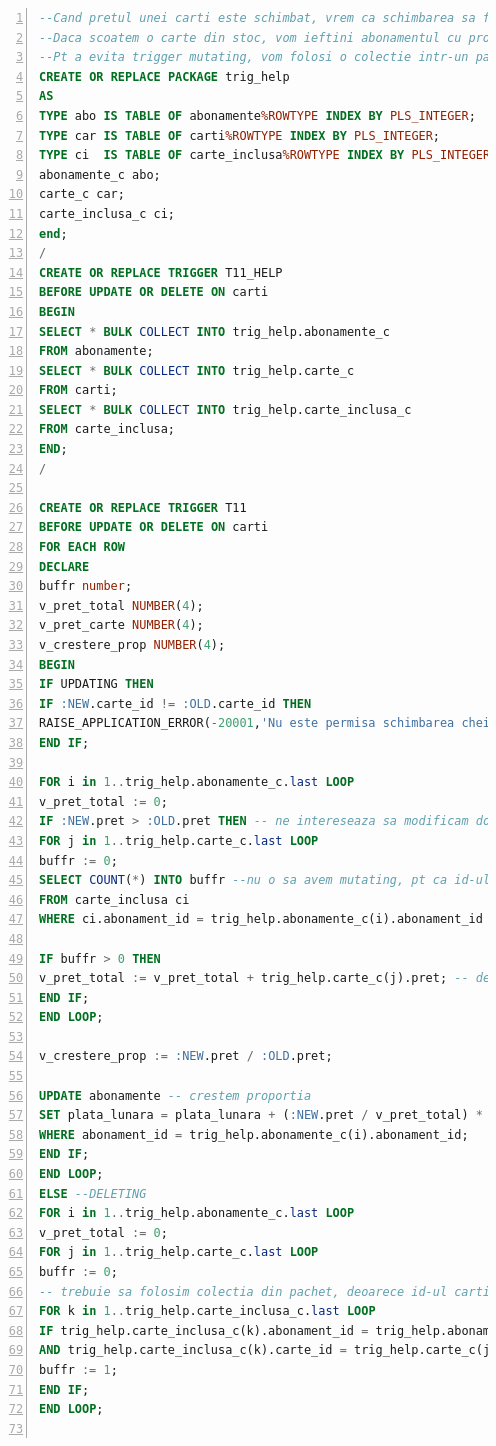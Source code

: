 \documentclass[12pt]{article}
\begin{document}
\begin{lstlisting}[language=SQL,
	showspaces=false,
	basicstyle=\ttfamily,
	numbers=left,
	numberstyle=\tiny,
	breaklines=true,
	commentstyle=\color{gray}]
--Cand pretul unei carti este schimbat, vrem ca schimbarea sa fie reflectata si in abonament, in cazul in care scumpim cartea
--Daca scoatem o carte din stoc, vom ieftini abonamentul cu procentajul pe care pretul cartii il reprezenta din intregul pachet al abonamentului.
--Pt a evita trigger mutating, vom folosi o colectie intr-un pachet, care este intializata cu un trigger la nivel de comanda.
CREATE OR REPLACE PACKAGE trig_help 
AS
TYPE abo IS TABLE OF abonamente%ROWTYPE INDEX BY PLS_INTEGER;
TYPE car IS TABLE OF carti%ROWTYPE INDEX BY PLS_INTEGER;
TYPE ci  IS TABLE OF carte_inclusa%ROWTYPE INDEX BY PLS_INTEGER;
abonamente_c abo;
carte_c car;
carte_inclusa_c ci;
end;
/
CREATE OR REPLACE TRIGGER T11_HELP
BEFORE UPDATE OR DELETE ON carti
BEGIN
SELECT * BULK COLLECT INTO trig_help.abonamente_c
FROM abonamente;
SELECT * BULK COLLECT INTO trig_help.carte_c
FROM carti;
SELECT * BULK COLLECT INTO trig_help.carte_inclusa_c
FROM carte_inclusa;
END;
/

CREATE OR REPLACE TRIGGER T11
BEFORE UPDATE OR DELETE ON carti
FOR EACH ROW
DECLARE 
buffr number;
v_pret_total NUMBER(4);
v_pret_carte NUMBER(4);
v_crestere_prop NUMBER(4);
BEGIN
IF UPDATING THEN
IF :NEW.carte_id != :OLD.carte_id THEN
RAISE_APPLICATION_ERROR(-20001,'Nu este permisa schimbarea cheiilor primare din tabelul Carte');
END IF;

FOR i in 1..trig_help.abonamente_c.last LOOP
v_pret_total := 0;
IF :NEW.pret > :OLD.pret THEN -- ne intereseaza sa modificam doar daca pretul cartii e crescut
FOR j in 1..trig_help.carte_c.last LOOP
buffr := 0;
SELECT COUNT(*) INTO buffr --nu o sa avem mutating, pt ca id-ul cartii nu se schimba
FROM carte_inclusa ci
WHERE ci.abonament_id = trig_help.abonamente_c(i).abonament_id AND ci.carte_id = trig_help.carte_c(j).carte_id;

IF buffr > 0 THEN
v_pret_total := v_pret_total + trig_help.carte_c(j).pret; -- deoarece valorile sunt luate cu un trigger before, e ca si cum am apela :OLD pt valoarea schimbata
END IF;
END LOOP;

v_crestere_prop := :NEW.pret / :OLD.pret;

UPDATE abonamente -- crestem proportia
SET plata_lunara = plata_lunara + (:NEW.pret / v_pret_total) * plata_lunara
WHERE abonament_id = trig_help.abonamente_c(i).abonament_id;
END IF;
END LOOP;
ELSE --DELETING
FOR i in 1..trig_help.abonamente_c.last LOOP
v_pret_total := 0;
FOR j in 1..trig_help.carte_c.last LOOP
buffr := 0;
-- trebuie sa folosim colectia din pachet, deoarece id-ul cartii este scos si din carte_inclusa
FOR k in 1..trig_help.carte_inclusa_c.last LOOP
IF trig_help.carte_inclusa_c(k).abonament_id = trig_help.abonamente_c(i).abonament_id
AND trig_help.carte_inclusa_c(k).carte_id = trig_help.carte_c(j).carte_id THEN
buffr := 1;
END IF;
END LOOP;


\end{lstlisting}
\end{document}
